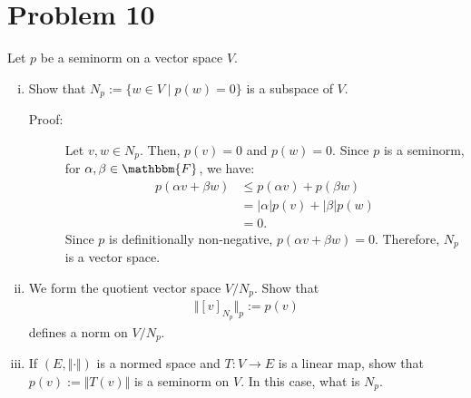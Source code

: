 \documentclass[8pt]{extarticle}
\begin{document}
  \section{Problem 10}%
  Let $p$ be a seminorm on a vector space $V$.
  \begin{enumerate}[(i)]
    \item Show that $N_p := \{w\in V\mid p(w)=0\}$ is a subspace of $V$.
      \begin{description}
        \item[Proof:] Let $v,w\in N_p$. Then, $p(v) = 0$ and $p(w) = 0$. Since $p$ is a seminorm, for $\alpha,\beta\in \mathbbm{F}$, we have:
          \begin{align*}
            p(\alpha v + \beta w) &\leq p(\alpha v) + p(\beta w)\\
                                  &= |\alpha| p(v) + |\beta|p(w)\\
                                  &= 0.
          \end{align*}
          Since $p$ is definitionally non-negative, $p(\alpha v + \beta w) = 0$. Therefore, $N_p$ is a vector space.
      \end{description}
    \item We form the quotient vector space $V/N_p$. Show that
      \begin{align*}
        \Vert [v]_{N_p}\Vert_{p} := p(v)
      \end{align*}
      defines a norm on $V/N_p$.
    \item If $(E,\Vert\cdot\Vert)$ is a normed space and $T: V\rightarrow E$ is a linear map, show that $p(v) := \Vert T(v)\Vert$ is a seminorm on $V$. In this case, what is $N_p$.
  \end{enumerate}
\end{document}
